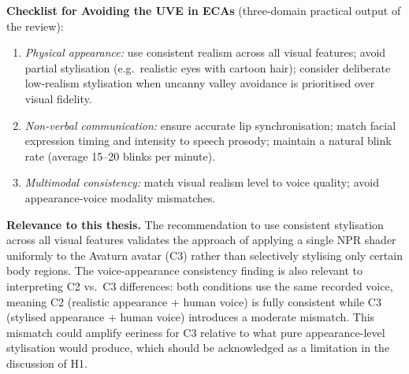 \documentclass[11pt, a4paper]{article}
\begin{document}
\textbf{Checklist for Avoiding the UVE in ECAs} (three-domain practical output of the review):
\begin{enumerate}[leftmargin=2.5em]
  \item \textit{Physical appearance:} use consistent realism across all visual features; avoid partial stylisation (e.g.\ realistic eyes with cartoon hair); consider deliberate low-realism stylisation when uncanny valley avoidance is prioritised over visual fidelity.
  \item \textit{Non-verbal communication:} ensure accurate lip synchronisation; match facial expression timing and intensity to speech prosody; maintain a natural blink rate (average 15--20 blinks per minute).
  \item \textit{Multimodal consistency:} match visual realism level to voice quality; avoid appearance-voice modality mismatches.
\end{enumerate}

\textbf{Relevance to this thesis.} The recommendation to use consistent stylisation across all visual features validates the approach of applying a single NPR shader uniformly to the Avaturn avatar (C3) rather than selectively stylising only certain body regions. The voice-appearance consistency finding is also relevant to interpreting C2 vs.\ C3 differences: both conditions use the same recorded voice, meaning C2 (realistic appearance + human voice) is fully consistent while C3 (stylised appearance + human voice) introduces a moderate mismatch. This mismatch could amplify eeriness for C3 relative to what pure appearance-level stylisation would produce, which should be acknowledged as a limitation in the discussion of H1.
\end{document}
